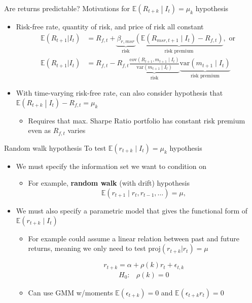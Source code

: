 \documentclass[xcolor=table, aspectratio=169]{beamer}
\begin{document}
\begin{frame}{Are returns predictable?}
Motivations for $\mathbb{E} \left(R_{t+k} \middle\vert I_t \right) = \mu_k$ hypothesis
\begin{itemize}
\item Risk-free rate, quantity of risk, and price of risk all constant
\begin{align*}
\mathbb{E}(R_{t+1} \vert I_t) &= R_{f,t} + \underbrace{\beta_{r,msr}}_{\text{risk}} \underbrace{\left( \mathbb{E}(R_{msr,t+1} \mid I_t) - R_{f,t} \right)}_{\text{risk premium}}, \text{ or}\\ 
\mathbb{E}(R_{t+1} \vert I_t)&= R_{f,t} - R_{f,t} \underbrace{\frac{\text{cov}(R_{t+1},m_{t+1} \mid I_t)}{\text{var}(m_{t+1} \mid I_t)}}_{\text{risk}} \underbrace{{\text{var}(m_{t+1} \mid I_t)}}_{\text{risk premium}} 
\end{align*}
\item With time-varying risk-free rate, can also consider hypothesis that $\mathbb{E} \left(R_{t+k} \middle\vert I_t \right) - R_{f,t} = \mu_k$
\begin{itemize}
\item Requires that max. Sharpe Ratio portfolio has constant risk premium even as $R_{f,t}$ varies
\end{itemize}
\end{itemize}
\end{frame}

\begin{frame}{Random walk hypothesis}
To test $\mathbb{E} \left( r_{t+k} \mid I_t \right) = \mu_k$ hypothesis
\begin{itemize}
\item We must specify the information set we want to condition on
\begin{itemize}
\item For example, \textbf{random walk} (with drift) hypothesis
$$\mathbb{E} \left( r_{t+1} \mid r_t, r_{t-1}, \ldots \right) = \mu,$$
\end{itemize}
\item We must also specify a parametric model that gives the functional form of $\mathbb{E} \left( r_{t+k} \mid I_t \right)$ 
\begin{itemize}
\item For example could assume a linear relation between past and future returns, meaning we only need to test $\text{proj}(r_{t+k} \vert r_t) = \mu$
\begin{footnotesize}
\vskip -4pt
$$r_{t+k} = \alpha + \rho(k) r_t + \epsilon_{t,k}$$
\vskip -8pt
$$\begin{array}{cc} H_0: & \rho(k) = 0 \end{array}$$
\end{footnotesize}
\vskip -4pt
\item Can use GMM w/moments $\mathbb{E}\left(\epsilon_{t+k}\right) = 0$ and $\mathbb{E}\left( \epsilon_{t+k} r_t \right)=0$
\end{itemize}
\end{itemize}
\end{frame}
\end{document}
